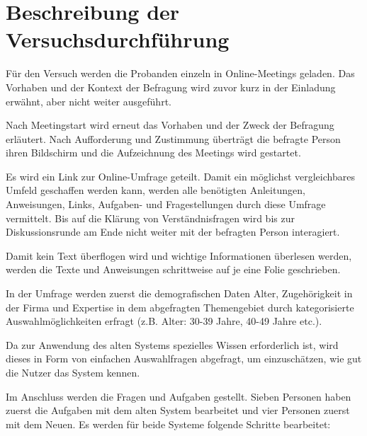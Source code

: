 \section{Beschreibung der Versuchsdurchführung}
\label{ch:Ergebnisse:sec:Versuchsdurchführung}

Für den Versuch werden die Probanden einzeln in Online-Meetings geladen. Das Vorhaben und der Kontext der Befragung wird zuvor kurz in der Einladung erwähnt, aber nicht weiter ausgeführt.

Nach Meetingstart wird erneut das Vorhaben und der Zweck der Befragung erläutert. Nach Aufforderung und Zustimmung überträgt die befragte Person ihren Bildschirm und die Aufzeichnung des Meetings wird gestartet.

Es wird ein Link zur Online-Umfrage geteilt. Damit ein möglichst vergleichbares Umfeld geschaffen werden kann, werden alle benötigten Anleitungen, Anweisungen, Links, Aufgaben- und Fragestellungen durch diese Umfrage vermittelt. Bis auf die Klärung von Verständnisfragen wird bis zur Diskussionsrunde am Ende nicht weiter mit der befragten Person interagiert.

Damit kein Text überflogen wird und wichtige Informationen überlesen werden, werden die Texte und Anweisungen schrittweise auf je eine Folie geschrieben.


In der Umfrage werden zuerst die demografischen Daten Alter, Zugehörigkeit in der Firma und Expertise in dem abgefragten Themengebiet durch kategorisierte Auswahlmöglichkeiten erfragt (z.B. Alter: 30-39 Jahre, 40-49 Jahre etc.).

Da zur Anwendung des alten Systems spezielles Wissen erforderlich ist, wird dieses in Form von einfachen Auswahlfragen abgefragt, um einzuschätzen, wie gut die Nutzer das System kennen.

Im Anschluss werden die Fragen und Aufgaben gestellt. Sieben Personen haben zuerst die Aufgaben mit dem alten System bearbeitet und vier Personen zuerst mit dem Neuen. Es werden für beide Systeme folgende Schritte bearbeitet:

